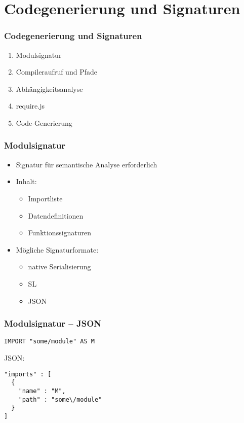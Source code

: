 \section{Codegenerierung und Signaturen}

\begin{frame}
\frametitle{Codegenerierung und Signaturen}
\begin{enumerate}
\item Modulsignatur
\item Compileraufruf und Pfade
\item Abhängigkeitsanalyse
\item require.js
\item Code-Generierung
\end{enumerate}
\end{frame}


\begin{frame}
\frametitle{Modulsignatur}

\begin{itemize}
\item Signatur für semantische Analyse erforderlich
\item Inhalt:
	\begin{itemize}
	\item Importliste
	\item Datendefinitionen
	\item Funktionssignaturen
	\end{itemize}
\item Mögliche Signaturformate:
	\begin{itemize}
	\item native Serialisierung
	\item SL
	\item JSON
	\end{itemize}
\end{itemize}

\end{frame}


\begin{frame}[containsverbatim=true]
\frametitle{Modulsignatur -- JSON}

\begin{verbatim}
IMPORT "some/module" AS M
\end{verbatim}

JSON:

\begin{lstlisting}
"imports" : [
  {
    "name" : "M",
    "path" : "some\/module"
  }
]
\end{lstlisting}


\end{frame}


